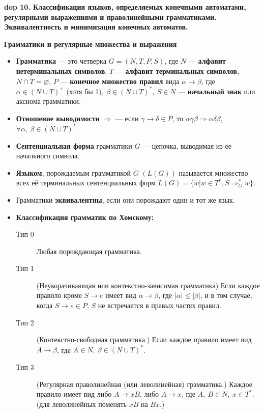 \textbf{\LARGE dop 10. Классификация  языков,  определяемых  конечными  автоматами,  регулярными  выражениями  и праволинейными грамматиками. Эквивалентность и минимизация конечных автоматов.}

\textbf{Грамматики и регулярные множества и выражения}
\begin{itemize}
    \item \textbf{Грамматика} --- это четверка $G = (N, T, P, S)$, где $N$ --- \textbf{алфавит нетерминальных символов}, $T$ --- \textbf{алфавит терминальных символов}, $N \cap T = \varnothing$, $P$ --- \textbf{конечное множество правил} вида $\alpha \rightarrow \beta$, где $\alpha \in (N \cup T)^+$ (хотя бы 1)$,~\beta \in (N \cup T)^\ast,~S \in N$ --- \textbf{начальный знак} или аксиома грамматики.
    \item \textbf{Отношение выводимости} $\Rightarrow$ --- если $\gamma \rightarrow \delta \in P$, то $\alpha \gamma \beta \Rightarrow \alpha \delta \beta$, $\forall \alpha,~\beta \in (N \cup T)^\ast$.
    \item \textbf{Сентенциальная форма} грамматики $G$ --- цепочка, выводимая из ее начального символа.
    \item \textbf{Языком}, порождаемым грамматикой $G$ $(L(G))$ называется множество всех её терминальных сентенциальных форм $L(G) = \{ w |w \in T^\ast , S \Rightarrow^{\ast}_G w\}$.
    \item Грамматики \textbf{эквивалентны}, если они порождают один и тот же язык.
    \item \textbf{Классификация грамматик по Хомскому:}
    \begin{description}
        \item[Тип 0] Любая порождающая грамматика.
        \item[Тип 1] (Неукорачивающая или контекстно-зависимая грамматика) Если каждое правило кроме $S \rightarrow e$ имеет вид $\alpha \rightarrow \beta$, где $|\alpha| \leqslant |\beta|$, и в том случае, когда $S \rightarrow e \in P$, $S$ не встречается в правых частях правил.
        \item[Тип 2] (Контекстно-свободная грамматика.) Если каждое правило имеет вид $A \rightarrow \beta$, где $A \in N,~\beta \in (N \cup T)^\ast$.
        \item[Тип 3] (Регулярная праволинейная (или леволинейная) грамматика.) Каждое правило имеет вид либо $A \rightarrow xB$, либо $A \rightarrow x$, где $A,~B \in N,~x \in T^\ast$. (для леволинейных поменять $xB$ на $Bx$.)
    \end{description}

\end{itemize}

